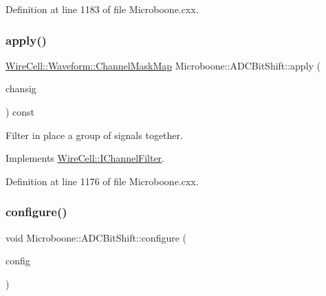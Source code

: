 Definition at line 1183 of file Microboone.\+cxx.

\mbox{\label{class_wire_cell_1_1_sig_proc_1_1_microboone_1_1_a_d_c_bit_shift_a6815b2cc680e5fb222239f2875773352}} 
\subsubsection{\texorpdfstring{apply()}{apply()}\hspace{0.1cm}{\footnotesize\ttfamily [2/2]}}
{\footnotesize\ttfamily \hyperlink{namespace_wire_cell_1_1_waveform_a18b9ae61c858e340252ba3ac83ac3bc0}{Wire\+Cell\+::\+Waveform\+::\+Channel\+Mask\+Map} Microboone\+::\+A\+D\+C\+Bit\+Shift\+::apply (\begin{DoxyParamCaption}\item[{\hyperlink{class_wire_cell_1_1_i_channel_filter_a44de35ce47701d84cd45393c6bcd5e2f}{channel\+\_\+signals\+\_\+t} \&}]{chansig }\end{DoxyParamCaption}) const\hspace{0.3cm}{\ttfamily [virtual]}}

Filter in place a group of signals together. 

Implements \hyperlink{class_wire_cell_1_1_i_channel_filter_a47554d77b1dca5596dc61e2221e0a137}{Wire\+Cell\+::\+I\+Channel\+Filter}.



Definition at line 1176 of file Microboone.\+cxx.

\mbox{\label{class_wire_cell_1_1_sig_proc_1_1_microboone_1_1_a_d_c_bit_shift_a9f38ca7b73b7a24d7ee38c6e90481fde}} 
\subsubsection{\texorpdfstring{configure()}{configure()}}
{\footnotesize\ttfamily void Microboone\+::\+A\+D\+C\+Bit\+Shift\+::configure (\begin{DoxyParamCaption}\item[{const \hyperlink{namespace_wire_cell_a9f705541fc1d46c608b3d32c182333ee}{Wire\+Cell\+::\+Configuration} \&}]{config }\end{DoxyParamCaption})\hspace{0.3cm}{\ttfamily [virtual]}}



